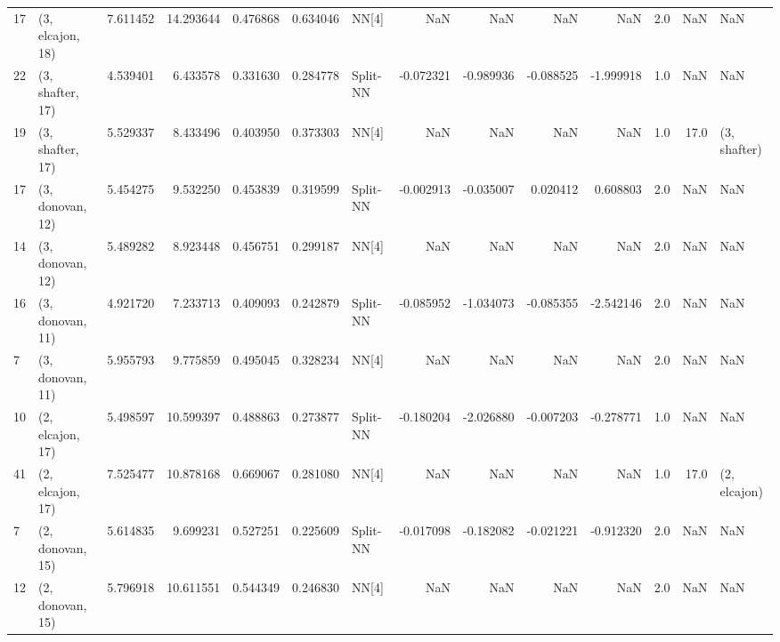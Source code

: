 \begin{tabular}{llrrrrlrrrrrrl}
17 &  (3, elcajon, 18) &   7.611452 &  14.293644 &   0.476868 &  0.634046 &       NN[4] &             NaN &           NaN &            NaN &          NaN &            2.0 &    NaN &              NaN \\
22 &  (3, shafter, 17) &   4.539401 &   6.433578 &   0.331630 &  0.284778 &    Split-NN &       -0.072321 &     -0.989936 &      -0.088525 &    -1.999918 &            1.0 &    NaN &              NaN \\
19 &  (3, shafter, 17) &   5.529337 &   8.433496 &   0.403950 &  0.373303 &       NN[4] &             NaN &           NaN &            NaN &          NaN &            1.0 &   17.0 &     (3, shafter) \\
17 &  (3, donovan, 12) &   5.454275 &   9.532250 &   0.453839 &  0.319599 &    Split-NN &       -0.002913 &     -0.035007 &       0.020412 &     0.608803 &            2.0 &    NaN &              NaN \\
14 &  (3, donovan, 12) &   5.489282 &   8.923448 &   0.456751 &  0.299187 &       NN[4] &             NaN &           NaN &            NaN &          NaN &            2.0 &    NaN &              NaN \\
16 &  (3, donovan, 11) &   4.921720 &   7.233713 &   0.409093 &  0.242879 &    Split-NN &       -0.085952 &     -1.034073 &      -0.085355 &    -2.542146 &            2.0 &    NaN &              NaN \\
7  &  (3, donovan, 11) &   5.955793 &   9.775859 &   0.495045 &  0.328234 &       NN[4] &             NaN &           NaN &            NaN &          NaN &            2.0 &    NaN &              NaN \\
10 &  (2, elcajon, 17) &   5.498597 &  10.599397 &   0.488863 &  0.273877 &    Split-NN &       -0.180204 &     -2.026880 &      -0.007203 &    -0.278771 &            1.0 &    NaN &              NaN \\
41 &  (2, elcajon, 17) &   7.525477 &  10.878168 &   0.669067 &  0.281080 &       NN[4] &             NaN &           NaN &            NaN &          NaN &            1.0 &   17.0 &     (2, elcajon) \\
7  &  (2, donovan, 15) &   5.614835 &   9.699231 &   0.527251 &  0.225609 &    Split-NN &       -0.017098 &     -0.182082 &      -0.021221 &    -0.912320 &            2.0 &    NaN &              NaN \\
12 &  (2, donovan, 15) &   5.796918 &  10.611551 &   0.544349 &  0.246830 &       NN[4] &             NaN &           NaN &            NaN &          NaN &            2.0 &    NaN &              NaN \\

\end{tabular}
